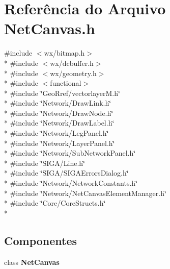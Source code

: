 \section{Referência do Arquivo Net\+Canvas.\+h}
\label{_net_canvas_8h}
{\ttfamily \#include $<$wx/bitmap.\+h$>$}\\*
{\ttfamily \#include $<$wx/dcbuffer.\+h$>$}\\*
{\ttfamily \#include $<$wx/geometry.\+h$>$}\\*
{\ttfamily \#include $<$functional$>$}\\*
{\ttfamily \#include \char`\"{}Geo\+Rref/vectorlayer\+M.\+h\char`\"{}}\\*
{\ttfamily \#include \char`\"{}Network/\+Draw\+Link.\+h\char`\"{}}\\*
{\ttfamily \#include \char`\"{}Network/\+Draw\+Node.\+h\char`\"{}}\\*
{\ttfamily \#include \char`\"{}Network/\+Draw\+Label.\+h\char`\"{}}\\*
{\ttfamily \#include \char`\"{}Network/\+Leg\+Panel.\+h\char`\"{}}\\*
{\ttfamily \#include \char`\"{}Network/\+Layer\+Panel.\+h\char`\"{}}\\*
{\ttfamily \#include \char`\"{}Network/\+Sub\+Network\+Panel.\+h\char`\"{}}\\*
{\ttfamily \#include \char`\"{}S\+I\+G\+A/\+Line.\+h\char`\"{}}\\*
{\ttfamily \#include \char`\"{}S\+I\+G\+A/\+S\+I\+G\+A\+Errors\+Dialog.\+h\char`\"{}}\\*
{\ttfamily \#include \char`\"{}Network/\+Network\+Constants.\+h\char`\"{}}\\*
{\ttfamily \#include \char`\"{}Network/\+Net\+Canvas\+Element\+Manager.\+h\char`\"{}}\\*
{\ttfamily \#include \char`\"{}Core/\+Core\+Structs.\+h\char`\"{}}\\*
\subsection*{Componentes}
\begin{DoxyCompactItemize}
\item 
class {\bf Net\+Canvas}
\end{DoxyCompactItemize}
